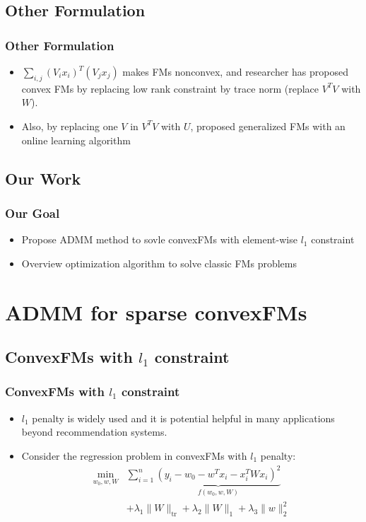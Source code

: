 \documentclass{beamer}
\begin{document}
  \subsection{Other Formulation}
  \begin{frame}
  \frametitle{Other Formulation}
    \begin{itemize}
      \item $\sum_{i, j} (V_ix_i)^T(V_jx_j)$ makes FMs nonconvex, and researcher has proposed convex FMs \cite{blondel2015convex} by replacing low rank constraint by trace norm (replace $V^TV$ with $W$).
      \item Also, by replacing one $V$ in $V^T V$ with $U$, \cite{lin2016non} proposed generalized FMs with an online learning algorithm
    \end{itemize}
  \end{frame}

  \subsection{Our Work}
  \begin{frame}
  \frametitle{Our Goal}
    \begin{itemize}
      \item Propose ADMM method to sovle convexFMs with element-wise $l_1$ constraint
      \item Overview optimization algorithm to solve classic FMs problems
    \end{itemize}
  \end{frame}

\section{ADMM for sparse convexFMs} %
\subsection{ConvexFMs with $l_1$ constraint}
\begin{frame}
\frametitle{ConvexFMs with $l_1$ constraint}
\begin{itemize}
  \item $l_1$ penalty is widely used and it is potential helpful in many applications beyond recommendation systems.
  \item Consider the regression problem in convexFMs with $l_1$ penalty:
    \begin{align*}
      \min_{w_0, w, W} & \sum_{i = 1}^n \underbrace{(y_i - w_0 - w^Tx_i - x_i^T W x_i)^2}_{f(w_0, w, W)} \\
      & + \lambda_1 \|W\|_{\text{tr}} + \lambda_2 \|W\|_1 + \lambda_3 \|w\|_2^2
    \end{align*}
\end{itemize}
\end{frame}
\end{document}
